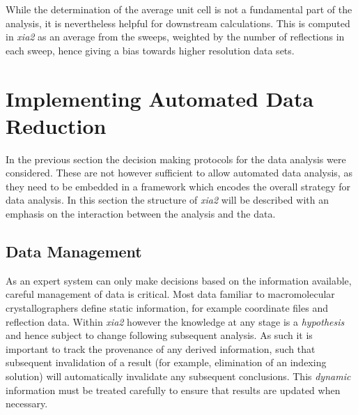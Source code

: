 \documentclass[preprint,pdf]{iucr}
\begin{document}
While the determination of the average unit cell is not a fundamental
part of the analysis, it is nevertheless helpful for downstream
calculations. This is computed in \emph{xia2} as an average from the
sweeps, weighted by the number of reflections in each sweep, hence
giving a bias towards higher resolution data sets.

\section{Implementing Automated Data Reduction}

In the previous section the decision making protocols for the data
analysis were considered. These are not however sufficient to allow
automated data analysis, as they need to be embedded in a framework
which encodes the overall strategy for data analysis. In this section
the structure of \emph{xia2} will be described with an emphasis on the
interaction between the analysis and the data.

\subsection{Data Management}

As an expert system can only make decisions based on the information
available, careful management of data is critical. Most data familiar
to macromolecular crystallographers define static
information, for example coordinate files and reflection data. 
Within \emph{xia2} however
the knowledge at any stage is a \emph{hypothesis} and hence
subject to change following subsequent analysis. As such it is
important to track the provenance of any derived information, such
that subsequent invalidation of a result (for example, elimination of
an indexing solution) will automatically invalidate any subsequent
conclusions. This \emph{dynamic} information must be treated carefully
to ensure that results are updated when necessary. 
\end{document}
